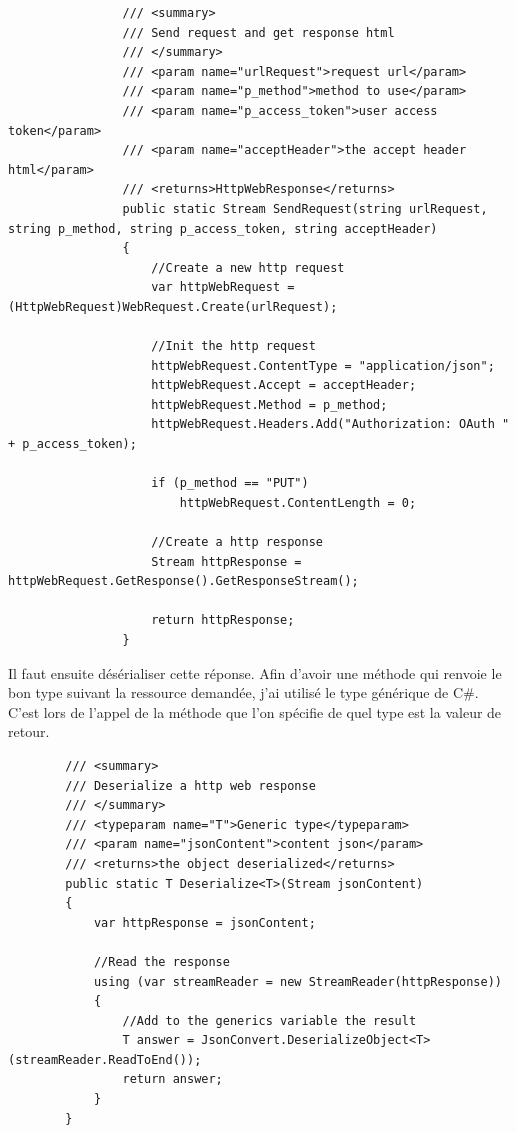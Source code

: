 \documentclass[11pt]{report} %
\begin{document}
		\begin{lstlisting}
		        /// <summary>
		        /// Send request and get response html
		        /// </summary>
		        /// <param name="urlRequest">request url</param>
		        /// <param name="p_method">method to use</param>
		        /// <param name="p_access_token">user access token</param>
		        /// <param name="acceptHeader">the accept header html</param>
		        /// <returns>HttpWebResponse</returns>
		        public static Stream SendRequest(string urlRequest, string p_method, string p_access_token, string acceptHeader)
		        {
			        //Create a new http request
			        var httpWebRequest = (HttpWebRequest)WebRequest.Create(urlRequest);
			        
			        //Init the http request
			        httpWebRequest.ContentType = "application/json";
			        httpWebRequest.Accept = acceptHeader;
			        httpWebRequest.Method = p_method;
			        httpWebRequest.Headers.Add("Authorization: OAuth " + p_access_token);
			        
			        if (p_method == "PUT")
				        httpWebRequest.ContentLength = 0;
			        
			        //Create a http response
			        Stream httpResponse = httpWebRequest.GetResponse().GetResponseStream();
			        
			        return httpResponse;
		        }
		\end{lstlisting}
		
		Il faut ensuite désérialiser cette réponse. Afin d’avoir une méthode qui renvoie le bon type suivant la ressource demandée, j’ai utilisé le type générique de C\#. C'est lors de l'appel de la méthode que l'on spécifie de quel type est la valeur de retour.
		
		\begin{lstlisting}
		/// <summary>
		/// Deserialize a http web response
		/// </summary>
		/// <typeparam name="T">Generic type</typeparam>
		/// <param name="jsonContent">content json</param>
		/// <returns>the object deserialized</returns>
		public static T Deserialize<T>(Stream jsonContent)
		{
			var httpResponse = jsonContent;
			
			//Read the response
			using (var streamReader = new StreamReader(httpResponse))
			{
				//Add to the generics variable the result
				T answer = JsonConvert.DeserializeObject<T>(streamReader.ReadToEnd());
				return answer;
			}
		}
		\end{lstlisting}
		
\end{document}
